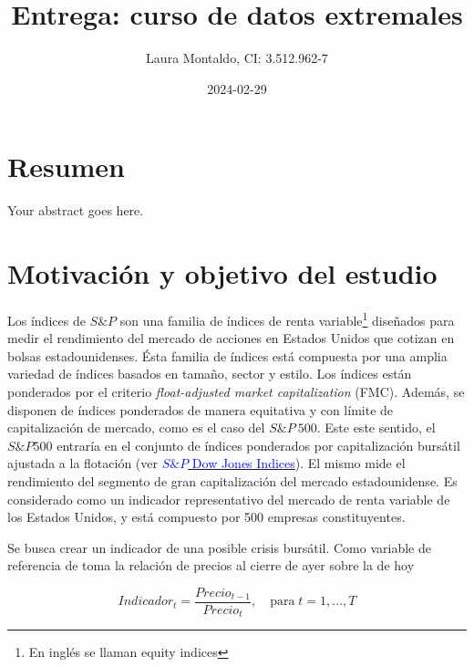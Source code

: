 \documentclass[
  oneside]{article}
\title{Entrega: curso de datos extremales}
\author{Laura Montaldo, CI: 3.512.962-7}
\date{2024-02-29}
\begin{document}
\maketitle

\newpage

\thispagestyle{empty}

\maketitle

\newpage

\tableofcontents

\newpage

\hypertarget{resumen}{%
\section{Resumen}\label{resumen}}

Your abstract goes here.

\newpage

\section{Motivación y objetivo del estudio}

Los índices de \(S\&P\) son una familia de índices de renta
variable\footnote{En inglés se llaman equity indices} diseñados para
medir el rendimiento del mercado de acciones en Estados Unidos que
cotizan en bolsas estadounidenses. Ésta familia de índices está
compuesta por una amplia variedad de índices basados en tamaño, sector y
estilo. Los índices están ponderados por el criterio
\textit{float-adjusted market capitalization} (FMC). Además, se disponen
de índices ponderados de manera equitativa y con límite de
capitalización de mercado, como es el caso del \(S\&P\:500\). Este este
sentido, el \(S\&P 500\) entraría en el conjunto de índices ponderados
por capitalización bursátil ajustada a la flotación (ver
\href{http://www.overleaf.com}{\textcolor{blue}{$S\&P$ Dow Jones Indices}}).
El mismo mide el rendimiento del segmento de gran capitalización del
mercado estadounidense. Es considerado como un indicador representativo
del mercado de renta variable de los Estados Unidos, y está compuesto
por 500 empresas constituyentes.

Se busca crear un indicador de una posible crisis bursátil. Como
variable de referencia de toma la relación de precios al cierre de ayer
sobre la de hoy

\begin{equation}
Indicador_t=\frac{Precio_{t-1}}{Precio_t},\quad\text{para}\; t=1,...,T \label{eq:ind}
\end{equation} \vspace{0.5cm}
\end{document}
